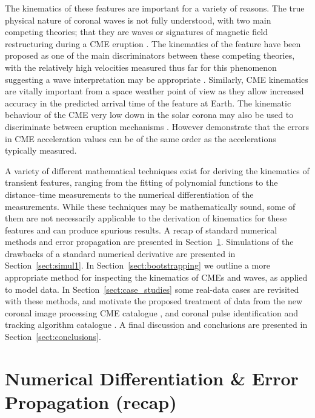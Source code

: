 \documentclass[structabstract]{aa}
\begin{document}
The kinematics of these features are important for a variety of reasons. The true physical nature of coronal waves is not fully understood, with two main competing theories; that they are waves \citep[e.g.,][]{2012ApJ...754....7S,2010ApJ...716L..57V} or signatures of magnetic field restructuring during a CME eruption \citep[e.g.,][]{2011ApJ...738..167S,2011ApJ...732L..20C}. The kinematics of the feature have been proposed as one of the main discriminators between these competing theories, with the relatively high velocities measured thus far for this phenomenon suggesting a wave interpretation may be appropriate \citep[cf.][]{2011A&A...532A.151W,2012ApJ...753..112Z}. Similarly, CME kinematics are vitally important from a space weather point of view as they allow increased accuracy in the predicted arrival time of the feature at Earth. The kinematic behaviour of the CME very low down in the solar corona may also be used to discriminate between eruption mechanisms \citep[cf.][]{2010A&A...516A..44L}. However \citet{2007ApJ...657.1117W} demonstrate that the errors in CME acceleration values can be of the same order as the accelerations typically measured. 

A variety of different mathematical techniques exist for deriving the kinematics of transient features, ranging from the fitting of polynomial functions to the distance--time measurements to the numerical differentiation of the measurements. While these techniques may be mathematically sound, some of them are not necessarily applicable to the derivation of kinematics for these features and can produce spurious results. A recap of standard numerical methods and error propagation are presented in Section~\ref{sect:num_diff_errors}. Simulations of the drawbacks of a standard numerical derivative are presented in Section~\ref{sect:simul1}. In Section~\ref{sect:bootstrapping} we outline a more appropriate method for inspecting the  kinematics of CMEs and waves, as applied to model data. In Section~\ref{sect:case_studies} some real-data cases are revisited with these methods, and motivate the proposed treatment of data from the new coronal image processing CME catalogue \citep[CORIMP;][]{2012ApJ...752..144M, 2012ApJ...752..145B}, and coronal pulse identification and tracking algorithm catalogue \citep[CorPITA;][]{2011A&A...531A..42L}. A final discussion and conclusions are presented in Section~\ref{sect:conclusions}.


\section{Numerical Differentiation \& Error Propagation (recap)}
\label{sect:num_diff_errors}
\end{document}
